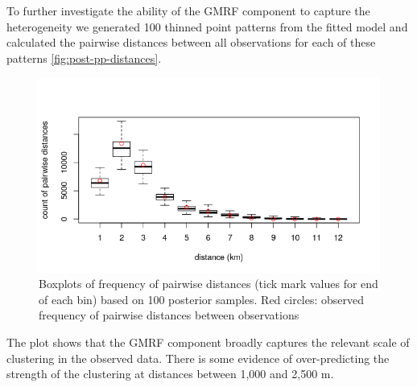 \documentclass{stylefile16/statsoc}
\begin{document}
To further investigate the ability of the GMRF component to capture the heterogeneity we generated 100 thinned point patterns from the fitted model and calculated the pairwise distances between all observations for each of these patterns \autoref{fig:post-pp-distances}.
\begin{figure}[!htb]
	\begin{center}
		\includegraphics[scale=0.6]{figures/post_pp_distances.png}
		\caption{Boxplots of frequency of pairwise distances (tick mark values for end of each bin) based on 100 posterior samples.  Red circles: observed frequency of pairwise distances between observations}
		\label{fig:post-pp-distances}
	\end{center}
\end{figure}
The plot shows that the GMRF component broadly captures the relevant scale of clustering in the observed data.  There is some evidence of over-predicting the strength of the clustering at distances between 1,000 and 2,500 m.
\end{document}

